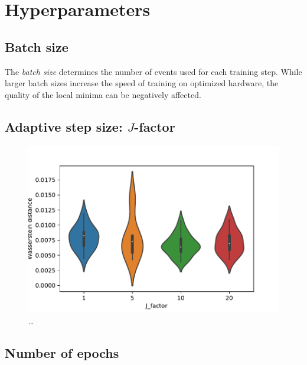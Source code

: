 \section{Hyperparameters}
\subsection{Batch size}
The \emph{batch size} determines the number of events used for each training step.
While larger batch sizes increase the speed of training
on optimized hardware,
the quality of the local minima can be negatively affected.


\subsection{Adaptive step size: $J$-factor}
\begin{figure}
  \centering
  \includegraphics[scale=1]{content/plots/halftime/wd_per_J_factor.pdf}
  \caption{…}
  \label{fig:hyperparameter:J_factor}
\end{figure}

\subsection{Number of epochs}
